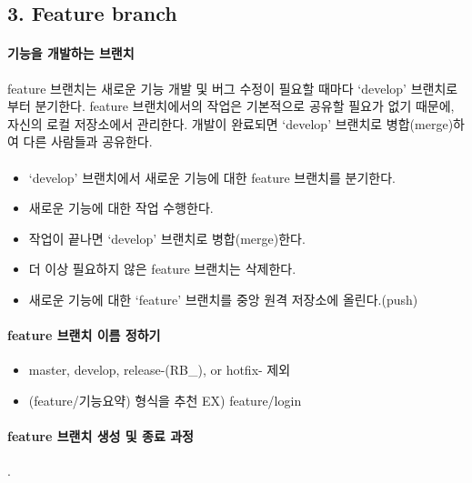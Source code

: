 \documentclass[12pt, a4paper, oneside]{book}
\begin{document}
	\subsection{3. Feature branch}

		\paragraph{기능을 개발하는 브랜치}
		feature 브랜치는 새로운 기능 개발 및 버그 수정이 필요할 때마다 ‘develop’ 브랜치로부터 분기한다. 
		feature 브랜치에서의 작업은 기본적으로 공유할 필요가 없기 때문에, 자신의 로컬 저장소에서 관리한다.
		개발이 완료되면 ‘develop’ 브랜치로 병합(merge)하여 다른 사람들과 공유한다.
		
		\paragraph{}

		\begin{itemize}
			\item		‘develop’ 브랜치에서 새로운 기능에 대한 feature 브랜치를 분기한다.
			\item		새로운 기능에 대한 작업 수행한다.
			\item		작업이 끝나면 ‘develop’ 브랜치로 병합(merge)한다.
			\item		더 이상 필요하지 않은 feature 브랜치는 삭제한다.
			\item		새로운 기능에 대한 ‘feature’ 브랜치를 중앙 원격 저장소에 올린다.(push)
		\end{itemize}

		\paragraph{feature 브랜치 이름 정하기}

		\begin{itemize}
			\item		master, develop, release-(RB\_), or hotfix- 제외
			\item		(feature/기능요약) 형식을 추천 EX) feature/login
		\end{itemize}


		\paragraph{feature 브랜치 생성 및 종료 과정}
		.\\	
\end{document}
